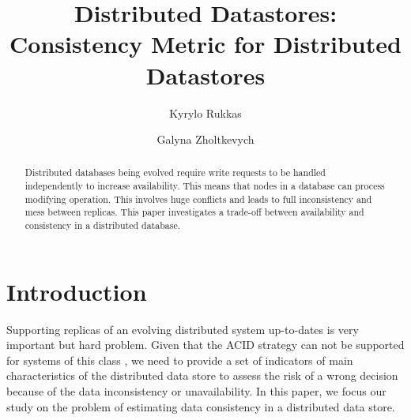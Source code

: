 \documentclass{llncs}
\begin{document}
\title{Distributed Datastores: Consistency Metric for Distributed Datastores}
\author{Kyrylo Rukkas\and Galyna Zholtkevych}
\maketitle
\begin{abstract}
Distributed databases being evolved require write requests to be handled independently to increase availability.
This means that nodes in a database can process modifying operation. This involves huge conflicts and leads to
full inconsistency and mess between replicas. This paper investigates a trade-off between availability and consistency
in a distributed database.
\end{abstract}

\section{Introduction}\label{sec:intro}
Supporting replicas of an evolving distributed system up-to-dates is very important but hard problem.
Given that the ACID strategy can not be supported for systems of this class \cite[{\color{red} references to the CAP-conjecture})]{?}, we need to provide a set of indicators of main characteristics of the distributed data store to assess the risk of a wrong decision because of the data inconsistency or unavailability.
In this paper, we focus our study on the problem of estimating data consistency in a distributed data store.
\end{document}
